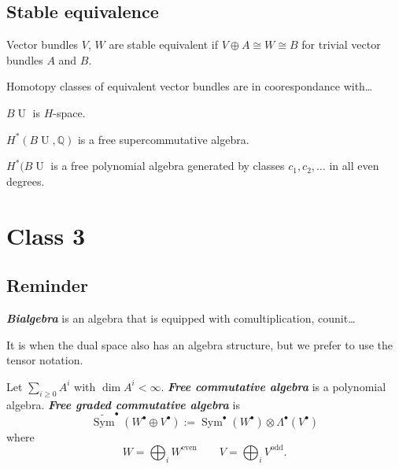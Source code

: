 \subsection{Stable equivalence}

\begin{defn}
	Vector bundles $V$,  $W$ are stable equivalent if  $V\oplus A\cong W\cong B$ for trivial vector bundles  $A$ and $B$.
\end{defn}

Homotopy classes of equivalent vector bundles are in coorespondance with…

\begin{thm}
	$B\operatorname{U}$ is $H$-space.
\end{thm}

\begin{coro}
	$H^* (B\operatorname{U},\mathbb{Q})$ is a free supercommutative algebra.
\end{coro}

\begin{claim}
	$H^*(B\operatorname{U}$ is a free polynomial algebra generated by classes $c_1,c_2,\ldots$ in all even degrees.
\end{claim}

\section{Class 3}

\subsection{Reminder}

\begin{defn}
	\textit{\textbf{Bialgebra}} is an algebra that is  equipped with comultiplication, counit…
\end{defn}

\begin{remark}
	It is when the dual space also has an algebra structure, but we prefer to use the tensor notation.
\end{remark}

Let $\sum_{i \geq 0}A^i$ with $\dim A^i<\infty$. \textit{\textbf{Free commutative algebra}} is a polynomial algebra.  \textit{\textbf{Free graded commutative algebra}} is
\[\widetilde{\operatorname{Sym}}^\bullet(W^\bullet \oplus V^\bullet):=\operatorname{Sym}^\bullet(W^\bullet)\otimes \Lambda^\bullet(V^\bullet)\]
where
\[W=\bigoplus_{i} W^{\operatorname{even}} \qquad V=\bigoplus_{i}V^{\operatorname{odd}}. \]

